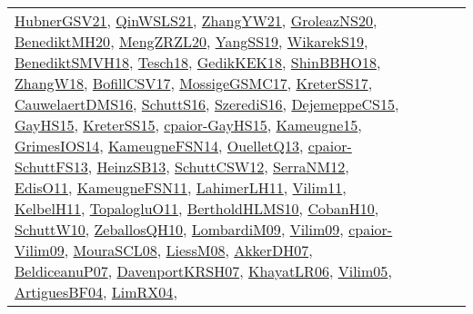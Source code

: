 {\begin{longtable}{llp{6cm}p{6cm}p{6cm}}
\href{articles/HubnerGSV21.pdf}{HubnerGSV21}\cite{HubnerGSV21}, \href{articles/QinWSLS21.pdf}{QinWSLS21}\cite{QinWSLS21}, \href{articles/ZhangYW21.pdf}{ZhangYW21}\cite{ZhangYW21}, \href{papers/GroleazNS20.pdf}{GroleazNS20}\cite{GroleazNS20}, \href{articles/BenediktMH20.pdf}{BenediktMH20}\cite{BenediktMH20}, \href{articles/MengZRZL20.pdf}{MengZRZL20}\cite{MengZRZL20}, \href{papers/YangSS19.pdf}{YangSS19}\cite{YangSS19}, \href{articles/WikarekS19.pdf}{WikarekS19}\cite{WikarekS19}, \href{papers/BenediktSMVH18.pdf}{BenediktSMVH18}\cite{BenediktSMVH18}, \href{papers/Tesch18.pdf}{Tesch18}\cite{Tesch18}, \href{articles/GedikKEK18.pdf}{GedikKEK18}\cite{GedikKEK18}, \href{articles/ShinBBHO18.pdf}{ShinBBHO18}\cite{ShinBBHO18}, \href{articles/ZhangW18.pdf}{ZhangW18}\cite{ZhangW18}, \href{papers/BofillCSV17.pdf}{BofillCSV17}\cite{BofillCSV17}, \href{papers/MossigeGSMC17.pdf}{MossigeGSMC17}\cite{MossigeGSMC17}, \href{articles/KreterSS17.pdf}{KreterSS17}\cite{KreterSS17}, \href{papers/CauwelaertDMS16.pdf}{CauwelaertDMS16}\cite{CauwelaertDMS16}, \href{papers/SchuttS16.pdf}{SchuttS16}\cite{SchuttS16}, \href{papers/SzerediS16.pdf}{SzerediS16}\cite{SzerediS16}, \href{papers/DejemeppeCS15.pdf}{DejemeppeCS15}\cite{DejemeppeCS15}, \href{papers/GayHS15.pdf}{GayHS15}\cite{GayHS15}, \href{papers/KreterSS15.pdf}{KreterSS15}\cite{KreterSS15}, \href{papers/cpaior-GayHS15.pdf}{cpaior-GayHS15}\cite{cpaior-GayHS15}, \href{articles/Kameugne15.pdf}{Kameugne15}\cite{Kameugne15}, \href{articles/GrimesIOS14.pdf}{GrimesIOS14}\cite{GrimesIOS14}, \href{articles/KameugneFSN14.pdf}{KameugneFSN14}\cite{KameugneFSN14}, \href{papers/OuelletQ13.pdf}{OuelletQ13}\cite{OuelletQ13}, \href{papers/cpaior-SchuttFS13.pdf}{cpaior-SchuttFS13}\cite{cpaior-SchuttFS13}, \href{articles/HeinzSB13.pdf}{HeinzSB13}\cite{HeinzSB13}, \href{papers/SchuttCSW12.pdf}{SchuttCSW12}\cite{SchuttCSW12}, \href{papers/SerraNM12.pdf}{SerraNM12}\cite{SerraNM12}, \href{papers/EdisO11.pdf}{EdisO11}\cite{EdisO11}, \href{papers/KameugneFSN11.pdf}{KameugneFSN11}\cite{KameugneFSN11}, \href{papers/LahimerLH11.pdf}{LahimerLH11}\cite{LahimerLH11}, \href{papers/Vilim11.pdf}{Vilim11}\cite{Vilim11}, \href{articles/KelbelH11.pdf}{KelbelH11}\cite{KelbelH11}, \href{articles/TopalogluO11.pdf}{TopalogluO11}\cite{TopalogluO11}, \href{papers/BertholdHLMS10.pdf}{BertholdHLMS10}\cite{BertholdHLMS10}, \href{papers/CobanH10.pdf}{CobanH10}\cite{CobanH10}, \href{papers/SchuttW10.pdf}{SchuttW10}\cite{SchuttW10}, \href{articles/ZeballosQH10.pdf}{ZeballosQH10}\cite{ZeballosQH10}, \href{papers/LombardiM09.pdf}{LombardiM09}\cite{LombardiM09}, \href{papers/Vilim09.pdf}{Vilim09}\cite{Vilim09}, \href{papers/cpaior-Vilim09.pdf}{cpaior-Vilim09}\cite{cpaior-Vilim09}, \href{papers/MouraSCL08.pdf}{MouraSCL08}\cite{MouraSCL08}, \href{articles/LiessM08.pdf}{LiessM08}\cite{LiessM08}, \href{papers/AkkerDH07.pdf}{AkkerDH07}\cite{AkkerDH07}, \href{papers/BeldiceanuP07.pdf}{BeldiceanuP07}\cite{BeldiceanuP07}, \href{papers/DavenportKRSH07.pdf}{DavenportKRSH07}\cite{DavenportKRSH07}, \href{articles/KhayatLR06.pdf}{KhayatLR06}\cite{KhayatLR06}, \href{papers/Vilim05.pdf}{Vilim05}\cite{Vilim05}, \href{papers/ArtiguesBF04.pdf}{ArtiguesBF04}\cite{ArtiguesBF04}, \href{papers/LimRX04.pdf}{LimRX04}\cite{LimRX04}, 
\end{longtable}}
